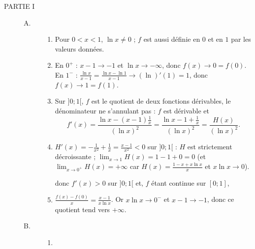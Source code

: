 \begin{description}
	\item[PARTIE I]
	\begin{description}
		\item[A. ]
		\begin{enumerate}
			\item {}
				Pour $0 < x < 1$, $\ln x \neq 0$ ; $f$ est aussi définie en $0$ et en $1$ par les valeurs données.
				\par\noindent{}
			\item {}
				En $0^+$ : $x - 1 \to -1$ et $\ln x \to -\infty$, donc $f(x) \to 0 = f(0)$.
				En $1^-$ : $\frac{\ln x}{x - 1} = \frac{\ln x - \ln 1}{x - 1} \to (\ln)'(1) = 1$, donc $f(x) \to 1 = f(1)$.
				\par\noindent{}
			\item \vln{Dérivabilité sur $]0;1[$ et signe de $f'$ :}
				Sur $]0;1[$, $f$ est le quotient de deux fonctions dérivables, le dénominateur ne s'annulant pas : $f$ est dérivable et
				\[
					f'(x) = \frac{\ln x - (x-1)\frac{1}{x}}{(\ln x)^2} = \frac{\ln x - 1 + \frac{1}{x}}{(\ln x)^2} = \frac{H(x)}{(\ln x)^2} .
				\]
				\par\noindent{}
			\item {}
				$H'(x) = -\frac{1}{x^2} + \frac{1}{x} = \frac{x - 1}{x^2} < 0$ sur $]0;1[$ : $H$ est strictement décroissante ; $\lim_{x\to 1} H(x) = 1 - 1 + 0 = 0$
				(et $\lim_{x\to 0^+} H(x) = +\infty$ car $H(x) = \frac{1 - x + x\ln x}{x}$ et $x \ln x \to 0$).
				\par\noindent\ansbox{$H(x) > 0$ sur $]0;1[$,}
				donc $f'(x) > 0$ sur $]0;1[$ et, $f$ étant continue sur $[0;1]$, \par\noindent{}
			\item {}
				$\frac{f(x) - f(0)}{x} = \frac{x - 1}{x \ln x}$. Or $x\ln x \to 0^-$ et $x - 1 \to -1$, donc ce quotient tend vers $+\infty$.
				\par\noindent{}
		\end{enumerate}
		\item[B. ]
		\begin{enumerate}
			\item {}

\end{enumerate}
\end{description}
\end{description}
